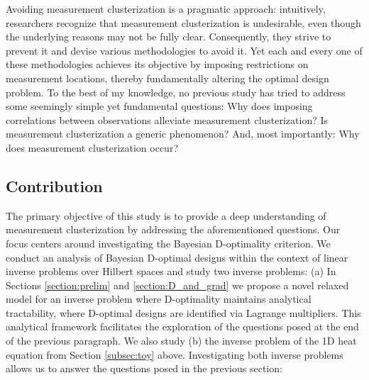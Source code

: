 \documentclass[ba]{imsart}
\theoremstyle{plain}
\theoremstyle{definition}
\theoremstyle{remark}
\begin{document}
Avoiding measurement clusterization is a pragmatic approach:
intuitively, researchers recognize that measurement clusterization is
undesirable, even though the underlying reasons may not be fully
clear. Consequently, they strive to prevent it and devise various
methodologies to avoid it. Yet each and every one of these
methodologies achieves its objective by imposing restrictions on
measurement locations, thereby fundamentally altering the optimal
design problem. To the best of my knowledge, no previous study has
tried to address some seemingly simple yet fundamental questions:
Why does imposing correlations between observations alleviate
measurement clusterization?
Is measurement clusterization a generic phenomenon? 
And, most importantly: Why does measurement clusterization occur?



\subsection{Contribution}
The primary objective of this study is to provide a deep understanding
of measurement clusterization by addressing the aforementioned
questions. Our focus centers around investigating the Bayesian
D-optimality criterion. We conduct an analysis of Bayesian D-optimal
designs within the context of linear inverse problems over Hilbert
spaces and study two inverse problems: (a) In Sections
\ref{section:prelim} and \ref{section:D_and_grad} we propose a novel
relaxed model for an inverse problem where D-optimality maintains
analytical tractability, where D-optimal designs are identified via
Lagrange multipliers. This analytical framework facilitates the
exploration of the questions posed at the end of the previous
paragraph. We also study (b) the inverse problem of the 1D heat
equation from Section \ref{subsec:toy} above. Investigating both
inverse problems allows us to answer the questions posed in the
previous section:
\end{document}
